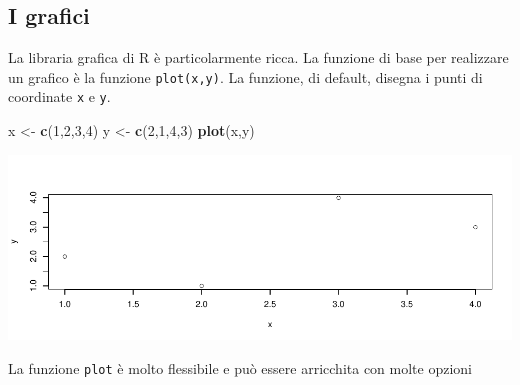 \documentclass[
  11pt,
]{book}
\newenvironment{Shaded}{\begin{snugshade}}{\end{snugshade}}
\newcommand{\DecValTok}[1]{\textcolor[rgb]{0.00,0.00,0.81}{#1}}
\newcommand{\FunctionTok}[1]{\textcolor[rgb]{0.13,0.29,0.53}{\textbf{#1}}}
\newcommand{\NormalTok}[1]{#1}
\newcommand{\OtherTok}[1]{\textcolor[rgb]{0.56,0.35,0.01}{#1}}
\theoremstyle{mytheoremstyle}
\theoremstyle{mydefstyle}
\begin{document}
\subsection{I grafici}\label{i-grafici}

La libraria grafica di R è particolarmente ricca. La funzione di base per
realizzare un grafico è la funzione \texttt{plot(x,y)}. La funzione, di default, disegna
i punti di coordinate \texttt{x} e \texttt{y}.

\begin{Shaded}
\begin{Highlighting}[]
\NormalTok{x }\OtherTok{\textless{}{-}} \FunctionTok{c}\NormalTok{(}\DecValTok{1}\NormalTok{,}\DecValTok{2}\NormalTok{,}\DecValTok{3}\NormalTok{,}\DecValTok{4}\NormalTok{)}
\NormalTok{y }\OtherTok{\textless{}{-}} \FunctionTok{c}\NormalTok{(}\DecValTok{2}\NormalTok{,}\DecValTok{1}\NormalTok{,}\DecValTok{4}\NormalTok{,}\DecValTok{3}\NormalTok{)}
\FunctionTok{plot}\NormalTok{(x,y)}
\end{Highlighting}
\end{Shaded}

\begin{center}\includegraphics{Appunti_di_Statistica_2025_files/figure-latex/24-Libro-24-1} \end{center}

La funzione \texttt{plot} è molto flessibile e può essere arricchita con molte opzioni
\end{document}
